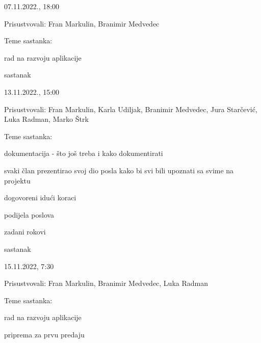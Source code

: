 \begin{packed_enum}
			\item[] \begin{packed_item}
				\item 07.11.2022., 18:00
				\item Prisustvovali: Fran Markulin, Branimir Medvedec
				\item Teme sastanka: 
				\begin{packed_item}
					\item  rad na razvoju aplikacije
				\end{packed_item}
			\end{packed_item}

			\item  sastanak
			
			\item[] \begin{packed_item}
				\item 13.11.2022., 15:00
				\item Prisustvovali: Fran Markulin, Karla Udiljak, Branimir Medvedec, Jura Starčević, Luka Radman, Marko Štrk
				\item Teme sastanka: 
				\begin{packed_item}
					\item  dokumentacija - što još treba i kako dokumentirati
					\item svaki član prezentirao svoj dio posla kako bi svi bili upoznati sa svime na projektu
					\item dogovoreni idući koraci
					\item podijela poslova
					\item zadani rokovi
				\end{packed_item}
			\end{packed_item}

			\item  sastanak
			
			\item[] \begin{packed_item}
				\item 15.11.2022, 7:30
				\item Prisustvovali: Fran Markulin, Branimir Medvedec, Luka Radman
				\item Teme sastanka: 
				\begin{packed_item}
					\item  rad na razvoju aplikacije
					\item priprema za prvu predaju
				\end{packed_item}
			\end{packed_item}


\end{packed_enum}

